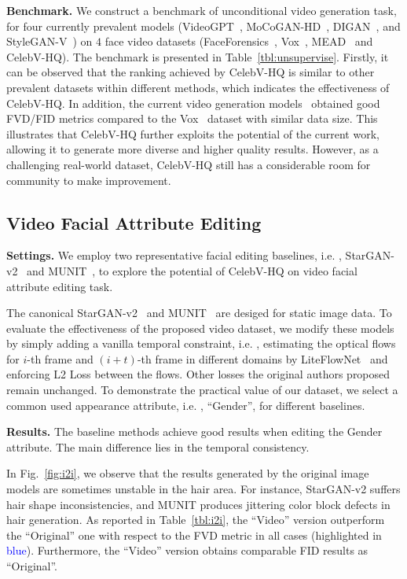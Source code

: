 \textbf{Benchmark.}
We construct a benchmark of unconditional video generation task, for four currently prevalent models (VideoGPT~\cite{yan2021videogpt}, MoCoGAN-HD~\cite{mocoganhd}, DIGAN~\cite{digan}, and StyleGAN-V~\cite{styleganv}) on $4$ face video datasets (FaceForensics~\cite{faceforensics}, Vox~\cite{vox17}, MEAD~\cite{mead} and CelebV-HQ). The benchmark is presented in Table~\ref{tbl:unsupervise}. 
Firstly, it can be observed that the ranking achieved by CelebV-HQ is similar to other prevalent datasets within different methods, which indicates the effectiveness of CelebV-HQ. In addition, the current video generation models~\cite{yan2021videogpt,mocoganhd,digan,styleganv} obtained good FVD/FID metrics compared to the Vox~\cite{vox17} dataset with similar data size. This illustrates that CelebV-HQ further exploits the potential of the current work, allowing it to generate more diverse and higher quality results. However, as a challenging real-world dataset, CelebV-HQ still has a considerable room for community to make improvement.

\subsection{Video Facial Attribute Editing}

\textbf{Settings.}
We employ two representative facial editing baselines, i.e. , StarGAN-v2~\cite{starganv2} and MUNIT~\cite{munit}, to explore the potential of CelebV-HQ on video facial attribute editing task.

The canonical StarGAN-v2~\cite{starganv2} and MUNIT~\cite{munit} are desiged for static image data. To evaluate the effectiveness of the proposed video dataset, we modify these models by simply adding a vanilla temporal constraint, i.e. , estimating the optical flows for $i$-th frame and $(i+t)$-th frame in different domains by LiteFlowNet~\cite{hui20liteflownet3} and enforcing L2 Loss between the flows. Other losses the original authors proposed remain unchanged. To demonstrate the practical value of our dataset, we select a common used appearance attribute, i.e. , ``Gender'', for different baselines. 

\textbf{Results.}
The baseline methods achieve good results when editing the Gender attribute. The main difference lies in the temporal consistency. 

In Fig.~\ref{fig:i2i}, we observe that the results generated by the original image models are sometimes unstable in the hair area. For instance, StarGAN-v2 suffers hair shape inconsistencies, and MUNIT produces jittering color block defects in hair generation. As reported in Table~\ref{tbl:i2i}, the ``Video'' version outperform the ``Original'' one with respect to the FVD metric in all cases (highlighted in \textcolor{blue}{blue}).
Furthermore, the ``Video'' version obtains comparable FID results as ``Original''. 

